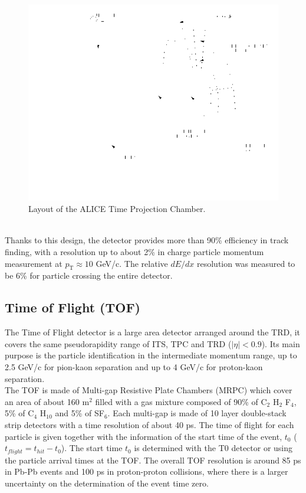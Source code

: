 \documentclass[b5paper,10pt,twoside,oldstyle,classica]{toptesi}
\newcommand{\pt}{p_\text{T}}
\begin{document}
\begin{figure}[tb]
\begin{center}
\includegraphics[scale = 0.4]{tpc.png}
\caption{Layout of the ALICE Time Projection Chamber.}
\label{TPC}
\end{center}
\end{figure}\\
Thanks to this design, the detector provides more than 90\% efficiency in track finding, with a resolution up to about 2\% in charge particle momentum measurement at $\pt \approx 10$ GeV/c. The relative $dE/dx$ resolution was measured to be 6\% for particle crossing the entire detector.
\subsection{Time of Flight (TOF)}
\label{TOFsec}
The Time of Flight detector \cite{Alici:2012fp} is a large area detector arranged around the TRD, it covers the same pseudorapidity range of ITS, TPC and TRD ($|\eta|< 0.9$). Its main purpose is the particle identification in the intermediate momentum range, up to 2.5 GeV/c for pion-kaon separation and up to 4 GeV/c for proton-kaon separation.\\
The TOF is made of Multi-gap Resistive Plate Chambers (MRPC) which cover an area of about 160 m$^2$ filled with a gas mixture
composed of 90\% of C$_2$ H$_2$ F$_4$, 5\% of C$_4$ H$_10$ and 5\% of SF$_6$. Each multi-gap is made of 10 layer double-stack strip detectors with a time resolution of about 40 ps. The time of flight for each particle is given together with the information of the start time of the event, $t_0$ ($t_{flight} = t_{hit}-t_0$). The start time $t_0$ is determined with the T0 detector or using the particle arrival times at the TOF. The overall TOF resolution is around 85 ps in Pb-Pb events and 100 ps in proton-proton collisions, where there is a larger uncertainty on the determination of the event time zero. \\
\end{document}
